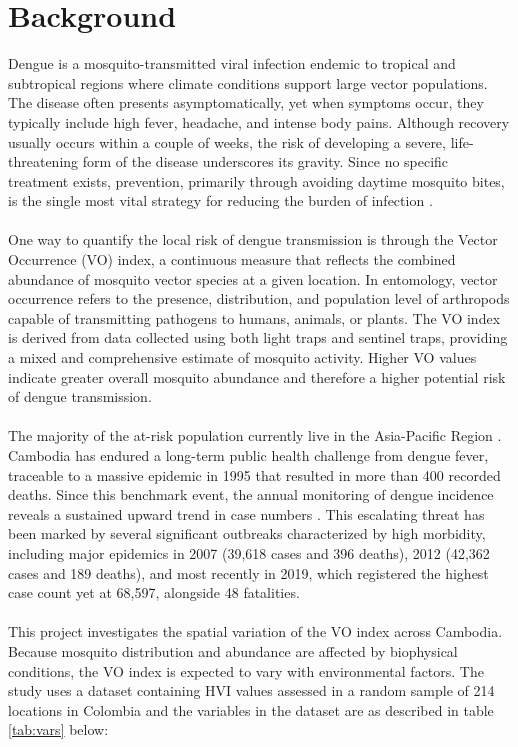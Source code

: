 \documentclass[12pt]{article}
\begin{document}
\section{Background}
Dengue is a mosquito-transmitted viral infection endemic to tropical and subtropical regions where climate conditions support large vector populations. The disease often presents asymptomatically, yet when symptoms occur, they typically include high fever, headache, and intense body pains\cite{who_dengue_severe_2025}. Although recovery usually occurs within a couple of weeks, the risk of developing a severe, life-threatening form of the disease underscores its gravity. Since no specific treatment exists, prevention, primarily through avoiding daytime mosquito bites, is the single most vital strategy for reducing the burden of infection \cite{who_dengue_severe_2025}. \\\\
\noindent One way to quantify the local risk of dengue transmission is through the Vector Occurrence (VO) index, a continuous measure that reflects the combined abundance of mosquito vector species at a given location. In entomology, vector occurrence refers to the presence, distribution, and population level of arthropods capable of transmitting pathogens to humans, animals, or plants. The VO index is derived from data collected using both light traps and sentinel traps, providing a mixed and comprehensive estimate of mosquito activity. Higher VO values indicate greater overall mosquito abundance and therefore a higher potential risk of dengue transmission. \\\\
\noindent  The majority of the at-risk population currently live in the Asia-Pacific Region \cite{who_dengue_severe_2025}. Cambodia has endured a long-term public health challenge from dengue fever, traceable to a massive epidemic in 1995 that resulted in more than 400 recorded deaths. Since this benchmark event, the annual monitoring of dengue incidence reveals a sustained upward trend in case numbers \cite{huy2010national} \cite{vong2010dengue} \cite{herbreteau2025spatio}. This escalating threat has been marked by several significant outbreaks characterized by high morbidity, including major epidemics in 2007 (39,618 cases and 396 deaths), 2012 (42,362 cases and 189 deaths), and most recently in 2019, which registered the highest case count yet at 68,597, alongside 48 fatalities\cite{maquart2021recent}. \\ \\
\noindent This project investigates the spatial variation of the VO index across Cambodia. Because mosquito distribution and abundance are affected by biophysical conditions, the VO index is expected to vary
with environmental factors. The study uses a dataset containing HVI values assessed in a random sample of 214 locations in Colombia and the variables in the dataset are as described in  table \ref{tab:vars} below:
\end{document}
